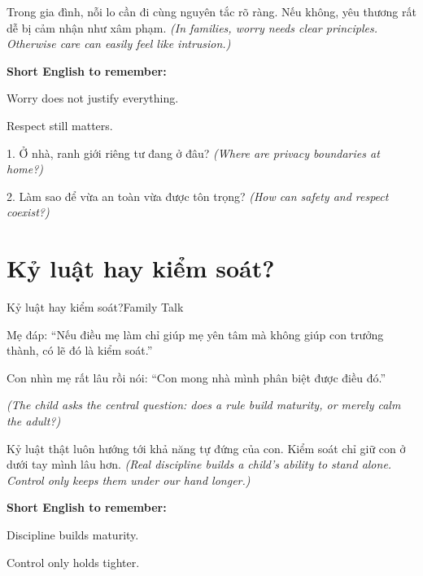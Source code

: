 \begin{baihoc}
Trong gia đình, nỗi lo cần đi cùng nguyên tắc rõ ràng. Nếu không, yêu thương rất dễ bị cảm nhận như xâm phạm.
\textit{(In families, worry needs clear principles. Otherwise care can easily feel like intrusion.)}
\end{baihoc}

\begin{ghinhoanh}
\textbf{Short English to remember:}

Worry does not justify everything.

Respect still matters.
\end{ghinhoanh}

\begin{tuhocnhanh}
1. Ở nhà, ranh giới riêng tư đang ở đâu? \textit{(Where are privacy boundaries at home?)}

2. Làm sao để vừa an toàn vừa được tôn trọng? \textit{(How can safety and respect coexist?)}
\end{tuhocnhanh}
\ngancach

\section{Kỷ luật hay kiểm soát?}
\begin{truyen}{Kỷ luật hay kiểm soát?}{Family Talk}

Mẹ đáp: ``Nếu điều mẹ làm chỉ giúp mẹ yên tâm mà không giúp con trưởng thành, có lẽ đó là kiểm soát.''

Con nhìn mẹ rất lâu rồi nói: ``Con mong nhà mình phân biệt được điều đó.''

\textit{(The child asks the central question: does a rule build maturity, or merely calm the adult?)}
\end{truyen}

\begin{baihoc}
Kỷ luật thật luôn hướng tới khả năng tự đứng của con. Kiểm soát chỉ giữ con ở dưới tay mình lâu hơn.
\textit{(Real discipline builds a child's ability to stand alone. Control only keeps them under our hand longer.)}
\end{baihoc}

\begin{ghinhoanh}
\textbf{Short English to remember:}

Discipline builds maturity.

Control only holds tighter.
\end{ghinhoanh}

